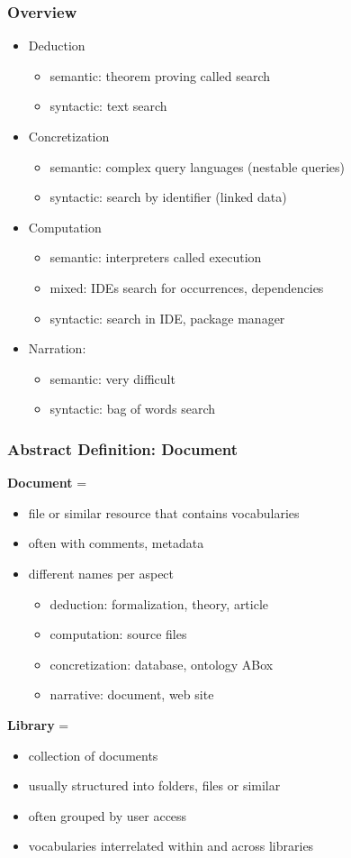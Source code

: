 \begin{frame}\frametitle{Overview}
\begin{itemize}
\item Deduction 
 \begin{itemize}
 \item semantic: theorem proving called search
 \item syntactic: text search
 \end{itemize}
\item Concretization
 \begin{itemize}
 \item semantic: complex query languages (nestable queries)
 \item syntactic: search by identifier (linked data)
 \end{itemize}
\item Computation
 \begin{itemize}
 \item semantic: interpreters called execution
 \item mixed: IDEs search for occurrences, dependencies
 \item syntactic: search in IDE, package manager
\end{itemize}
\item Narration:
 \begin{itemize}
 \item semantic: very difficult
 \item syntactic: bag of words search
 \end{itemize}
\end{itemize}
\end{frame}


\begin{frame}\frametitle{Abstract Definition: Document}
\textbf{Document} =
\begin{itemize}
\item file or similar resource that contains vocabularies
\item often with comments, metadata
\item different names per aspect
\begin{itemize}
\item deduction: formalization, theory, article
\item computation: source files
\item concretization: database, ontology ABox
\item narrative: document, web site
\end{itemize}
\end{itemize}

\textbf{Library} =
\begin{itemize}
\item collection of documents
\item usually structured into folders, files or similar
\item often grouped by user access 
\item vocabularies interrelated within and across libraries
\end{itemize}
\end{frame}

